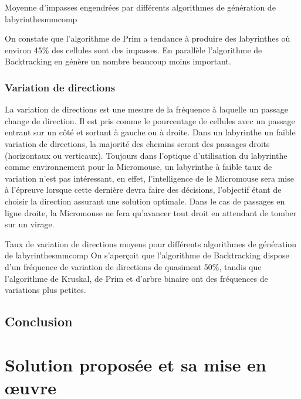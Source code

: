 {Moyenne d'impasses engendrées par différents algorithmes de génération de labyrinthes}{mmcomp}


On constate que l'algorithme de Prim a tendance à produire des labyrinthes où environ 45\% des cellules sont des impasses. En parallèle l'algorithme de Backtracking en génère un nombre beaucoup moins important.


\subsubsection{Variation de directions}
La variation de directions est une mesure de la fréquence à laquelle un passage change de direction. Il est pris comme le pourcentage de cellules avec un passage entrant sur un côté et sortant à gauche ou à droite.
Dans un labyrinthe un faible variation de directions, la majorité des chemins seront des passages droits (horizontaux ou verticaux). Toujours dans l'optique d'utilisation du labyrinthe comme environnement pour la Micromouse, un labyrinthe à faible taux de variation n'est pas intéressant, en effet, l'intelligence de le Micromouse sera mise à l'épreuve lorsque cette dernière devra faire des décisions, l'objectif étant de choisir la direction assurant une solution optimale. Dans le cas de passages en ligne droite, la Micromouse ne fera qu'avancer tout droit en attendant de tomber sur un virage.


{Taux de variation de directions moyens pour différents algorithmes de génération de labyrinthes}{mmcomp}
On s'aperçoit que l'algorithme de Backtracking dispose d'un fréquence de variation de directions de quasiment 50\%, tandis que l'algorithme de Kruskal, de Prim et d'arbre binaire ont des fréquences de variations plus petites.
\subsection{Conclusion}

\newpage


\section{Solution proposée et sa mise en œuvre} \label{sec:solution2}
